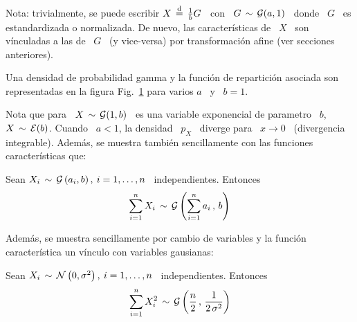 Nota: trivialmente, se puede escribir $X \,  \stackrel{\mathrm{d}}{=} \, \frac{1}{b} G$ \ con \ $G
\, \sim \, \mathcal{G}(a,1)$  \ donde \ $G$ \ es estandardizada  o normalizada. De nuevo,
las  caracter\'isticas  de \  $X$  \  son  v\'inculadas a  las  de  \ $G$  \  (y
vice-versa) por transformaci\'on afine (ver secciones anteriores).

Una densidad de probabilidad gamma  y la funci\'on de repartici\'on asociada son
representadas en  la figura Fig.~\ref{Fig:MP:Gamma} para  varios $a$ \ y  \ $b =
1$.
%
\begin{figure}[h!]
\begin{center}  \end{center}
%
\label{Fig:MP:Gamma}
\end{figure}

Nota  que para  \  $X \,  \sim  \, \mathcal{G}(1,b)$  \ es  una  variable exponencial  de
parametro \  $b$, \ie \ $X \,  \sim \, \mathcal{E}(b)$. Cuando  \ $a < 1$,  la densidad \
$p_X$  \ diverge  para \  $x  \to 0$  \ (divergencia  integrable). Adem\'as,  se
muestra tambi\'en sencillamente con las funciones caracter\'isticas que:
%
\begin{lema}[Stabilidad]
\label{Lem:MP:StabilidadGamma}
%
  Sean $X_i  \, \sim  \, \mathcal{G}\left( a_i  , b  \right), \: i  = 1 ,  \ldots ,  n$ \
  independientes. Entonces
  \[
  \sum_{i=1}^n X_i \, \sim \, \mathcal{G}\left( \sum_{i=1}^n a_i \, , \, b \right)
  \]
\end{lema}

Adem\'as,  se muestra  sencillamente  por  cambio de  variables  y la  funci\'on
caracter\'istica un v\'inculo con variables gausianas:
%
\begin{lema}
\label{Lem:MP:VinculoGammaGaussiana}
%
  Sean $X_i \, \sim \,  \mathcal{N}\left( 0 , \sigma^2 \right), \: i = 1  , \ldots , n$ \
  independientes. Entonces
  \[
  \sum_{i=1}^n  X_i^2 \,  \sim \,  \mathcal{G}\left( \frac{n}{2}  \, ,  \,  \frac{1}{2 \,
      \sigma^2} \right)
  \]
\end{lema}

